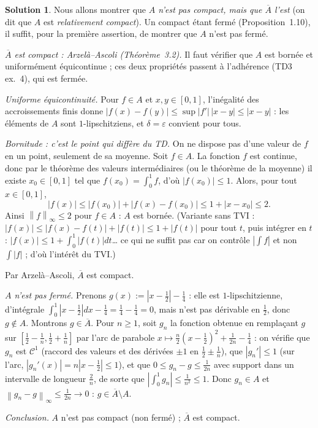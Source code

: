 \documentclass[11pt,a4paper]{article}
\newcommand{\adh}[1]{\overline{#1}}
\newcommand{\norm}[1]{\left\|#1\right\|}
\theoremstyle{definition}
\newtheorem*{solution}{Solution}
\begin{document}
\begin{solution}
Nous allons montrer que \emph{$A$ n'est pas compact, mais que $\adh A$ l'est} (on dit que $A$ est \emph{relativement compact}). Un compact étant fermé (Proposition~1.10), il suffit, pour la première assertion, de montrer que $A$ n'est pas fermé.

\emph{$\adh A$ est compact : Arzelà--Ascoli (Théorème~3.2).} Il faut vérifier que $A$ est bornée et uniformément équicontinue ; ces deux propriétés passent à l'adhérence (TD3 ex.~4), qui est fermée.

\emph{Uniforme équicontinuité.} Pour $f\in A$ et $x,y\in[0,1]$, l'inégalité des accroissements finis donne $|f(x)-f(y)|\le\sup|f'|\,|x-y|\le|x-y|$ : les éléments de $A$ sont $1$-lipschitziens, et $\delta=\varepsilon$ convient pour tous.

\emph{Bornitude : c'est le point qui diffère du TD.} On ne dispose pas d'une valeur de $f$ en un point, seulement de sa moyenne. Soit $f\in A$. La fonction $f$ est continue, donc par le théorème des valeurs intermédiaires (ou le théorème de la moyenne) il existe $x_0\in[0,1]$ tel que $f(x_0)=\int_0^1f$, d'où $|f(x_0)|\le1$. Alors, pour tout $x\in[0,1]$,
\[
|f(x)|\le|f(x_0)|+|f(x)-f(x_0)|\le1+|x-x_0|\le2 .
\]
Ainsi $\norm f_\infty\le2$ pour $f\in A$ : $A$ est bornée. (Variante sans TVI : $|f(x)|\le|f(x)-f(t)|+|f(t)|\le1+|f(t)|$ pour tout $t$, puis intégrer en $t$ : $|f(x)|\le1+\int_0^1|f(t)|dt$… ce qui ne suffit pas car on contrôle $|\int f|$ et non $\int|f|$ ; d'où l'intérêt du TVI.)

Par Arzelà--Ascoli, $\adh A$ est compact.

\emph{$A$ n'est pas fermé.} Prenons $g(x):=|x-\tfrac12|-\tfrac14$ : elle est $1$-lipschitzienne, d'intégrale $\int_0^1|x-\frac12|dx-\frac14=\frac14-\frac14=0$, mais n'est pas dérivable en $\frac12$, donc $g\notin A$. Montrons $g\in\adh A$. Pour $n\ge1$, soit $g_n$ la fonction obtenue en remplaçant $g$ sur $[\frac12-\frac1n,\frac12+\frac1n]$ par l'arc de parabole $x\mapsto\frac n2(x-\frac12)^2+\frac1{2n}-\frac14$ : on vérifie que $g_n$ est $\mathcal C^1$ (raccord des valeurs et des dérivées $\pm1$ en $\frac12\pm\frac1n$), que $|g_n'|\le1$ (sur l'arc, $|g_n'(x)|=n|x-\frac12|\le1$), et que $0\le g_n-g\le\frac1{2n}$ avec support dans un intervalle de longueur $\frac2n$, de sorte que $|\int_0^1g_n|\le\frac1{n^2}\le1$. Donc $g_n\in A$ et $\norm{g_n-g}_\infty\le\frac1{2n}\to0$ : $g\in\adh A\setminus A$.

\emph{Conclusion.} $A$ n'est pas compact (non fermé) ; $\adh A$ est compact.
\end{solution}
\end{document}

